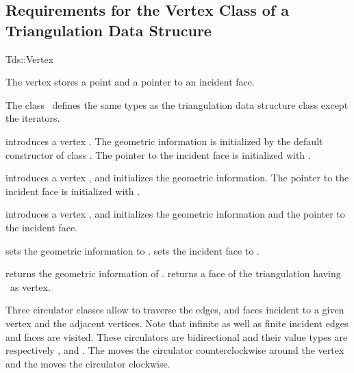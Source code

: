 \subsection{Requirements for the Vertex Class of a Triangulation Data Strucure}
\label{I1_Sect_Tds_Vertex}
\begin{ccClass}{Tds::Vertex}

\ccThreeToTwo

The vertex stores a point and a pointer to an incident face.

\ccInheritsFrom {}

\ccTypes
The class \ccClassName\
defines the same types as the triangulation data structure class 
except the iterators.
\begin{ccAdvanced}

\ccCreation

{introduces a vertex \ccVar. The geometric information is
 initialized by the default constructor of class .
The pointer to the incident face is initialized with .}

{introduces a vertex \ccVar, and initializes the geometric information.
The pointer to the incident face is initialized with \ccc{NULL}.}

{introduces a vertex \ccVar, and initializes the geometric information and 
the pointer to the incident face.}
\end{ccAdvanced}


\begin{ccAdvanced}

{sets the geometric information to .}
\ccGlue
{}
{sets the incident face to .}


\end{ccAdvanced}



{returns  the geometric information of \ccVar.}
\ccGlue
{}
{returns a face of the triangulation having  \ccVar\ as vertex.}

Three circulator classes allow to traverse the edges, and faces
incident to a given vertex and the adjacent vertices.
Note that infinite as well as finite incident edges and faces are visited.
 These circulators are bidirectional
and their value types are respectively , 
and .
The   moves the circulator
counterclockwise around the vertex 
and  the  moves the circulator
clockwise. 


\end{ccClass}
